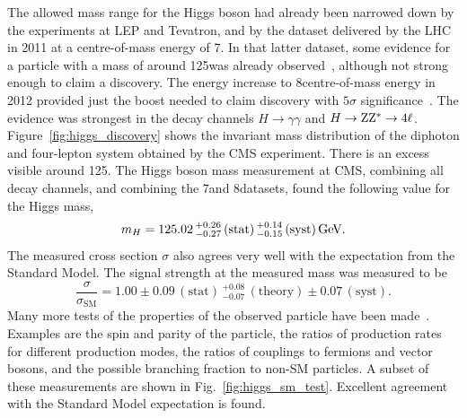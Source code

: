 The allowed mass range for the Higgs boson had already been narrowed down by the experiments at LEP
and Tevatron, and by the dataset delivered by the LHC in 2011 at a centre-of-mass energy of 7\TeV. 
In that latter dataset, some evidence for a particle with a mass of around 125\GeV was already
observed~\cite{Chatrchyan:2012tx}, although not strong enough to claim a discovery. 
The energy increase to 8\TeV centre-of-mass energy in 2012 provided just the boost needed to claim
discovery with $5\sigma$ significance~\cite{Chatrchyan:2012ufa}. The evidence was strongest in the
decay channels $H\rightarrow\gamma\gamma$ and $H\rightarrow\mathrm{Z}\mathrm{Z}^*\rightarrow 4\ell$.
Figure~\ref{fig:higgs_discovery} shows the invariant mass distribution of the diphoton and
four-lepton system obtained by the CMS experiment. There is an excess visible around 125\GeV. 
The Higgs boson mass measurement at CMS, combining all decay channels, and combining the 7\TeV and
8\TeV datasets, found the following value for the Higgs mass,
\begin{equation}
  m_H = 125.02 {\,}^{+0.26}_{-0.27} \, (\text{stat}) {\,}^{+0.14}_{-0.15} \, (\text{syst}) \,\text{Ge\hspace{-.08em}V}.
\end{equation}
The measured cross section $\sigma$ also agrees very well with the expectation from the Standard
Model. The signal strength at the measured mass was measured to be
\begin{equation}
 \frac{\sigma}{\sigma_{\text{SM}}} = 1.00 \pm 0.09 \, (\text{stat})
{\,}^{+0.08}_{-0.07} \, (\text{theory}) \pm 0.07 \, (\text{syst}) .
\end{equation}
Many more tests of the properties of the observed particle have been
made~\cite{Khachatryan:2014jba}. Examples are the spin and parity of the particle, the ratios of
production rates for different production modes, the ratios of couplings to fermions and vector
bosons, and the possible branching fraction to non-SM particles. 
A subset of these measurements are shown in Fig.~\ref{fig:higgs_sm_test}. Excellent agreement with
the Standard Model expectation is found.

